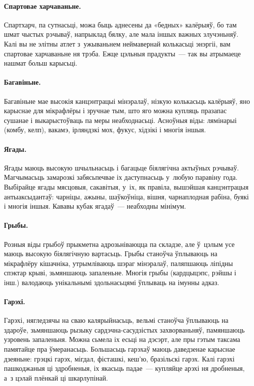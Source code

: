 \paragraph{Спартовае харчаваньне.}
Спартхарч, па сутнасьці, можа быць аднесены да «бедных» калёрыяў, бо там шмат чыстых рэчываў, напрыклад бялку, але мала іншых важных злучэньняў. Калі вы не элітны атлет з~ужываньнем неймавернай колькасьці энэргіі, вам спартовае харчаваньне ня трэба. Ежце цэльныя прадукты~--- так вы атрымаеце нашмат больш карысьці.

\paragraph{Багавіньне.}
Багавіньне мае высокія канцэнтрацыі мінэралаў, нізкую колькасьць калёрыяў, яно карыснае для мікрафлёры і зручнае тым, што яго можна купляць празапас сушанае і выкарыстоўваць па меры неабходнасьці. Асноўныя віды: лямінарыі (комбу, келп), вакамэ, ірляндзкі мох, фукус, хідзікі і многія іншыя.

\paragraph{Ягады.}
Ягады маюць высокую шчыльнасьць і багацьце біялягічна актыўных рэчываў. Магчымасьць замарозкі забясьпечвае іх даступнасьць у~любую паравіну года. Выбірайце ягады мясцовыя, сакавітыя, у~іх, як правіла, вышэйшая канцэнтрацыя антыаксыдантаў: чарніцы, ажыны, шаўкоўніца, вішня, чарнаплодная рабіна, буякі і многія іншыя. Кававы кубак ягадаў~--- неабходны мінімум.

\paragraph{Грыбы.}
Розныя віды грыбоў прыкметна адрозьніваюцца па складзе, але ў~цэлым усе маюць высокую біялягічную вартасьць. Грыбы станоўча ўплываюць на мікрафлёру кішачніка, утрымліваюць шэраг мінэралаў, паляпшаюць ліпідны спэктар крыві, зьмяншаюць запаленьне. Многія грыбы (кардцыцэпс, рэйшы і інш.) валодаюць унікальнымі здольнасьцямі ўплываць на імунны адказ.

\paragraph{Гарэхі.}
Гарэхі, нягледзячы на сваю калярыйнасьць, вельмі станоўча ўплываюць на здароўе, зьмяншаюць рызыку сардэчна-сасудзістых захворваньняў, памяншаюць узровень запаленьня. Можна сьмела іх есьці на дэсэрт, але пры гэтым таксама памятайце пра ўмеранасьць. Большасьць гарэхаў маюць даведзенае карыснае дзеяньне: грэцкі гарэх, мігдал, фісташкі, кеш'ю, бразільскі гарэх. Калі гарэхі пашкоджаныя ці здробненыя, іх якасьць падае~--- купляйце арэхі ня дробненыя, а~з цэлай плёнкай ці шкарлупінай.

